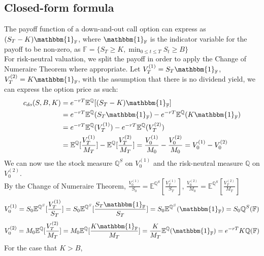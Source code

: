 \subsection{Closed-form formula}
The payoff function of a down-and-out call option can express as $(S_{T} - K)\mathbbm{1}_{\mathbb{F}}$, where $\mathbbm{1}_{\mathbb{F}}$ is the indicator variable for the payoff to be non-zero, as $\displaystyle \mathbb{F} = \{ S_{T} \ge K, \min_{0 \le t \le T} S_{t} \ge B \}$\\[1mm]
For risk-neutral valuation, we split the payoff in order to apply the Change of Numeraire Theorem where appropriate. Let $V_{T}^{(1)} = S_{T}\mathbbm{1}_{\mathbb{F}}$, $V_{T}^{(2)} =  K\mathbbm{1}_{\mathbb{F}}$, with the assumption that there is no dividend yield, we can express the option price as such:
\begin{equation*}
\begin{split}
c_{do}(S, B, K)
&= e^{-rT}\mathbb{E}^{\mathbb{Q}}[(S_{T} - K)\mathbbm{1}_{\mathbb{F}}]\\
&= e^{-rT}\mathbb{E}^{\mathbb{Q}}(S_{T}\mathbbm{1}_{\mathbb{F}}) - e^{-rT}\mathbb{E}^{\mathbb{Q}}(K\mathbbm{1}_{\mathbb{F}})\\
&= e^{-rT}\mathbb{E}^{\mathbb{Q}}(V_{T}^{(1)}) - e^{-rT}\mathbb{E}^{\mathbb{Q}}(V_{T}^{(2)})\\
&= \mathbb{E}^{\mathbb{Q}}[\frac{V_{T}^{(1)}}{M_{T}}] - \mathbb{E}^{\mathbb{Q}}[\frac{V_{T}^{(2)}}{M_{T}}] = \frac{V_{0}^{(1)}}{M_{0}} - \frac{V_{0}^{(2)}}{M_{0}} = V_{0}^{(1)} - V_{0}^{(2)}
\end{split}
\end{equation*}
We can now use the stock measure $\mathbb{Q}^{S}$ on $V_{0}^{(1)}$ and the risk-neutral measure $\mathbb{Q}$ on $V_{0}^{(2)}$.\\
By the Change of Numeraire Theorem, $\frac{V_{0}^{(1)}}{S_{0}} = \mathbb{E}^{\mathbb{Q}^{S}}[\frac{V_{T}^{(1)}}{S_{T}}]$, $\frac{V_{0}^{(2)}}{M_{0}} = \mathbb{E}^{\mathbb{Q}^{S}}[\frac{V_{T}^{(2)}}{M_{T}}]$\\
$$V_{0}^{(1)} = S_{0}\mathbb{E}^{\mathbb{Q}^{S}}[\frac{V_{T}^{(1)}}{S_{T}}] = S_{0}\mathbb{E}^{\mathbb{Q}^{S}}[\frac{S_{T}\mathbbm{1}_{\mathbb{F}}}{S_{T}}] = S_{0}\mathbb{E}^{\mathbb{Q}^{S}}(\mathbbm{1}_{\mathbb{F}}) = S_{0}\mathbb{Q}^{S}({\mathbb{F}})$$
$$V_{0}^{(2)} = M_{0}\mathbb{E}^{\mathbb{Q}}[\frac{V_{T}^{(2)}}{M_{T}}] = M_{0}\mathbb{E}^{\mathbb{Q}}[\frac{K\mathbbm{1}_{\mathbb{F}}}{M_{T}}] = \frac{K}{M_{T}}\mathbb{E}^{\mathbb{Q}}(\mathbbm{1}_{\mathbb{F}}) = e^{-rT}K\mathbb{Q}({\mathbb{F}})$$
For the case that $K > B$,

